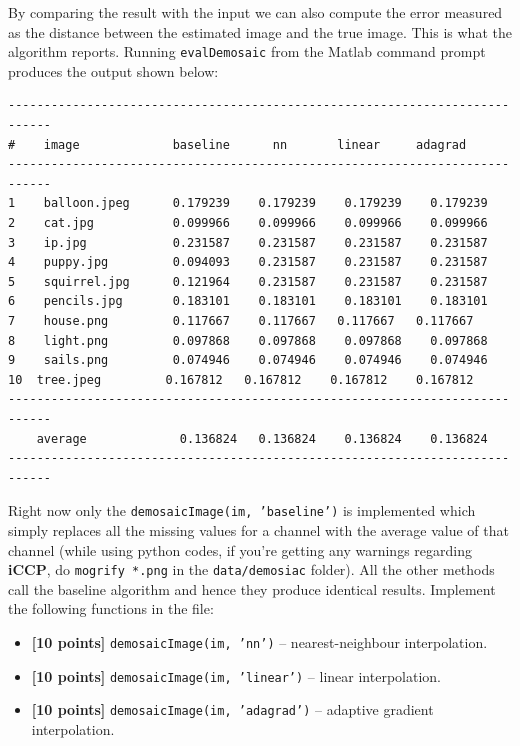 \documentclass[10pt,letterpaper]{article}
\newcommand{\cmd}[1] {{\color{blue}\texttt{#1}}}
\begin{document}
By comparing the result with the input we can also compute the error measured as the distance between the estimated image and the true image. This is what the algorithm reports. Running \cmd{evalDemosaic} from the Matlab command prompt produces the output shown below:

\begin{verbatim}
----------------------------------------------------------------------------
#    image             baseline      nn       linear     adagrad
----------------------------------------------------------------------------
1    balloon.jpeg      0.179239    0.179239    0.179239    0.179239 
2    cat.jpg           0.099966    0.099966    0.099966    0.099966 
3    ip.jpg            0.231587    0.231587    0.231587    0.231587 
4    puppy.jpg         0.094093    0.231587    0.231587    0.231587 
5    squirrel.jpg      0.121964    0.231587    0.231587    0.231587 
6    pencils.jpg       0.183101    0.183101    0.183101    0.183101 
7    house.png         0.117667    0.117667   0.117667   0.117667 
8    light.png         0.097868    0.097868    0.097868    0.097868 
9    sails.png         0.074946    0.074946    0.074946    0.074946 
10  tree.jpeg         0.167812   0.167812    0.167812    0.167812 
----------------------------------------------------------------------------
    average             0.136824   0.136824    0.136824    0.136824 
----------------------------------------------------------------------------
\end{verbatim}

Right now only the \cmd{demosaicImage(im, 'baseline')} is implemented which simply replaces all the missing values for a channel with the average value of that channel (while using python codes, if you're getting any warnings regarding \textbf{iCCP}, do \cmd{mogrify *.png} in the \cmd{data/demosiac} folder). All the other methods call the baseline algorithm and hence they produce identical results. Implement the following functions in the file:

\begin{itemize}
\item \textbf{[10 points]} \cmd{demosaicImage(im, 'nn')} -- nearest-neighbour interpolation.
\item \textbf{[10 points]} \cmd{demosaicImage(im, 'linear')} -- linear interpolation.
\item \textbf{[10 points]} \cmd{demosaicImage(im, 'adagrad')} -- adaptive gradient interpolation.
\end{itemize}
\end{document}
